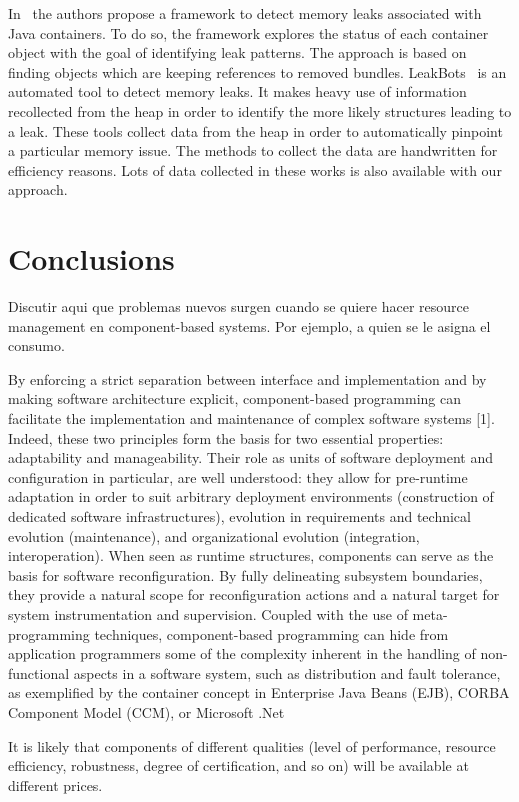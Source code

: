 In~\cite{Xu:2013:PML:2491509.2491511} the authors propose a framework to detect memory leaks associated with Java containers.
To do so, the framework explores the status of each container object with the goal of identifying leak patterns. The approach is based on finding objects which are keeping references to removed bundles. LeakBots~\cite{Mitchell03leakbot:an} is an automated tool to detect memory leaks. It makes heavy
use of information recollected from the heap in order to identify the more likely structures leading to a leak.
These tools collect data from the heap in order to automatically pinpoint a particular memory issue.
The methods to collect the data are handwritten for efficiency reasons.
Lots of data collected in these works is also available with our approach.



\section{Conclusions}

Discutir aqui que problemas nuevos surgen cuando se quiere hacer resource management en component-based systems. Por ejemplo, a quien se le asigna el consumo.

By enforcing a strict separation between interface and implementation and by making software
architecture explicit, component-based programming can facilitate the implementation and
maintenance of complex software systems [1]. Indeed, these two principles form the basis for two
essential properties: adaptability and manageability. Their role as units of software deployment and
configuration in particular, are well understood: they allow for pre-runtime adaptation in order to
suit arbitrary deployment environments (construction of dedicated software infrastructures), evolution
in requirements and technical evolution (maintenance), and organizational evolution (integration,
interoperation). When seen as runtime structures, components can serve as the basis for software
reconfiguration. By fully delineating subsystem boundaries, they provide a natural scope for
reconfiguration actions and a natural target for system instrumentation and supervision. Coupled with
the use of meta-programming techniques, component-based programming can hide from application
programmers some of the complexity inherent in the handling of non-functional aspects in a software
system, such as distribution and fault tolerance, as exemplified by the container concept in Enterprise
Java Beans (EJB), CORBA Component Model (CCM), or Microsoft .Net

It is likely that components of different qualities (level of performance, resource efficiency,
robustness, degree of certification, and so on) will be available at different
prices.

